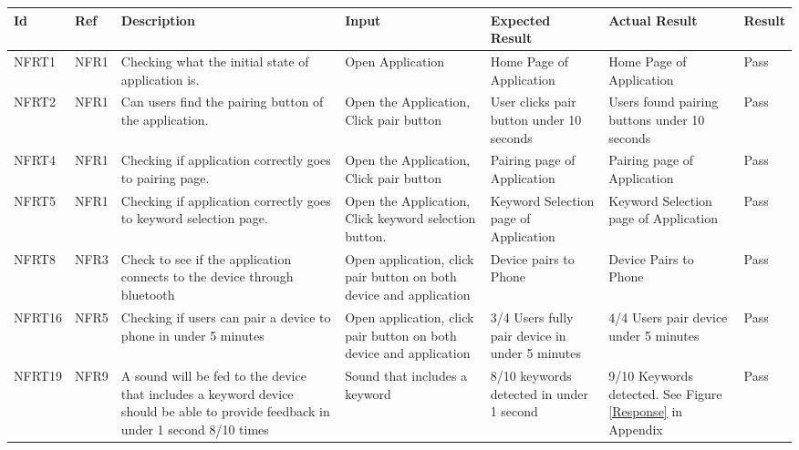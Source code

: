 \documentclass[12pt, titlepage]{article}
\begin{document}
\begin{longtable}{|p{1.4cm}|p{1cm}|p{3cm}|p{1.5cm}|p{2.5cm}|p{2cm}|p{1.2cm}|}
  \endfirsthead
  \endhead
  \hline
  \textbf{Id} & \textbf{Ref} & \textbf{Description}                                                         & \textbf{Input}                                    & \textbf{Expected Result}    & \textbf{Actual Result}                          & \textbf{Result}                                     \\ \hline
  NFRT1        & NFR1          & Checking what the initial state of application is.              & Open Application                          & Home Page of Application                      & Home Page of Application                        & {\color[HTML]{32CB00} Pass}                         \\ \hline
  NFRT2        & NFR1          & Can users find the pairing button of the application.           & Open the Application, Click pair button   & User clicks pair button under 10 seconds      & Users found pairing buttons under 10 seconds    & {\color[HTML]{32CB00} Pass}                         \\ \hline
  NFRT4        & NFR1          & Checking if application correctly goes to pairing page.         & Open the Application, Click pair button   & Pairing page of Application                   & Pairing page of Application                     & {\color[HTML]{32CB00} Pass}                         \\ \hline
  NFRT5        & NFR1          & Checking if application correctly goes to keyword selection page.& Open the Application, Click keyword selection button.& Keyword Selection page of Application& Keyword Selection page of Application        & {\color[HTML]{32CB00} Pass}                         \\ \hline
  NFRT8        & NFR3          & Check to see if the application connects to the device through bluetooth& Open application, click pair button on both device and application&Device pairs to Phone&Device Pairs to Phone                       & {\color[HTML]{32CB00} Pass}                        \\ \hline
  NFRT16       & NFR5          & Checking if users can pair a device to phone in under 5 minutes  & Open application, click pair button on both device and application& 3/4 Users fully pair device in under 5 minutes& 4/4 Users pair device under 5 minutes&{\color[HTML]{32CB00} Pass}            \\ \hline
  NFRT19       & NFR9          & A sound will be fed to the device that includes a keyword device should be able to provide feedback in under 1 second 8/10 times& Sound that includes a keyword&8/10 keywords detected in under 1 second& 9/10 Keywords detected. See Figure \ref*{Response} in Appendix&{\color[HTML]{32CB00} Pass}         \\ \hline

\end{longtable}
\end{document}
